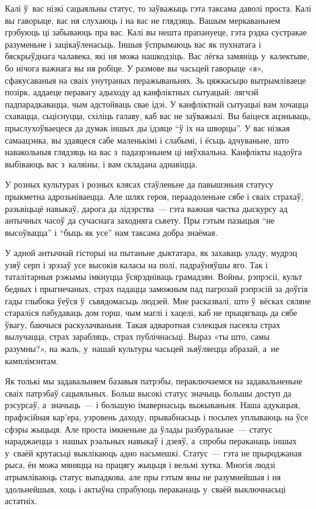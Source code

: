 Калі ў~вас нізкі сацыяльны статус, то заўважыць гэта таксама даволі проста. Калі вы гаворыце, вас ня слухаюць і на вас не глядзяць. Вашым меркаваньнем грэбуюць ці забываюць пра вас. Калі вы нешта прапануеце, гэта рэдка сустракае разуменьне і зацікаўленасьць. Іншыя ўспрымаюць вас як пухнатага і бяскрыўднага чалавека, які ня можа нашкодзіць. Вас лёгка замяніць у~калектыве, бо нічога важнага вы ня робіце. У размове вы часьцей гаворыце «я», сфакусаваныя на сваіх унутраных перажываньнях. Зь цяжкасьцю вытрымліваеце позірк, аддаеце перавагу адыходу ад канфліктных сытуацый: лягчэй падпарадкавацца, чым адстойваць свае ідэі. У канфліктнай сытуацыі вам хочацца схавацца, сьціснуцца, схіліць галаву, каб вас не заўважылі. Вы баіцеся ацэньваць, прыслухоўваецеся да думак іншых ды ідзяце ``ў іх на шворцы''. У вас нізкая самаацэнка, вы здаяцеся сабе маленькімі і слабымі, і ёсьць адчуваньне, што навакольныя глядзяць на вас з~падазрэньнем ці няўхвальна. Канфлікты надоўга выбіваюць вас з~каляіны, і вам складана аднавіцца.

У розных культурах і розных клясах стаўленьне да павышэньня статусу прыкметна адрозьніваецца. Але шлях героя, пераадоленьне сябе і сваіх страхаў, разьвіцьцё навыкаў, дарога да лідэрства~--- гэта важная частка дыскурсу ад антычных часоў да сучаснага заходняга сьвету. Пры гэтым пазыцыя ``не высоўвацца'' і ``быць як усе'' нам таксама добра знаёмая.

У адной антычнай гісторыі на пытаньне дыктатара, як захаваць уладу, мудрэц узяў серп і зрэзаў усе высокія каласы на полі, падраўняўшы яго. Так і таталітарныя рэжымы імкнуцца ўсярэдніваць грамадзян. Войны, рэпрэсіі, культ бедных і прыгнечаных, страх падацца заможным пад пагрозай рэпрэсій за доўгія гады глыбока ўеўся ў~сьвядомасьць людзей. Мне расказвалі, што ў~вёсках сяляне стараліся пабудаваць дом горш, чым маглі і хацелі, каб не прыцягваць да сябе ўвагу, баючыся раскулачваньня. Такая адваротная сэлекцыя пасеяла страх вылучацца, страх зарабляць, страх публічнасьці. Выраз «ты што, самы разумны?», на жаль, у~нашай культуры часьцей зьяўляецца абразай, а~не камплімэнтам.

Як толькі мы задавальняем базавыя патрэбы, пераключаемся на задавальненьне сваіх патрэбаў сацыяльных. Больш высокі статус значыць большы доступ да рэсурсаў, а~значыць~--- і большую імавернасьць выжываньня. Наша адукацыя, прафэсійная кар'ера, узровень даходу, прывабнасьць і посьпех уплываюць на ўсе сфэры жыцьця. Але проста імкненьне да ўлады разбуральнае~--- статус нараджаецца з~нашых рэальных навыкаў і дзеяў, а~спробы пераканаць іншых у~сваёй крутасьці выклікаюць адно насьмешкі. Статус~--- гэта не прыроджаная рыса, ён можа мяняцца на працягу жыцьця і вельмі хутка. Многія людзі атрымліваюць статус выпадкова, але пры гэтым яны не разумнейшыя і ня здольнейшыя, хоць і актыўна спрабуюць пераканаць у~сваёй выключнасьці астатніх.

